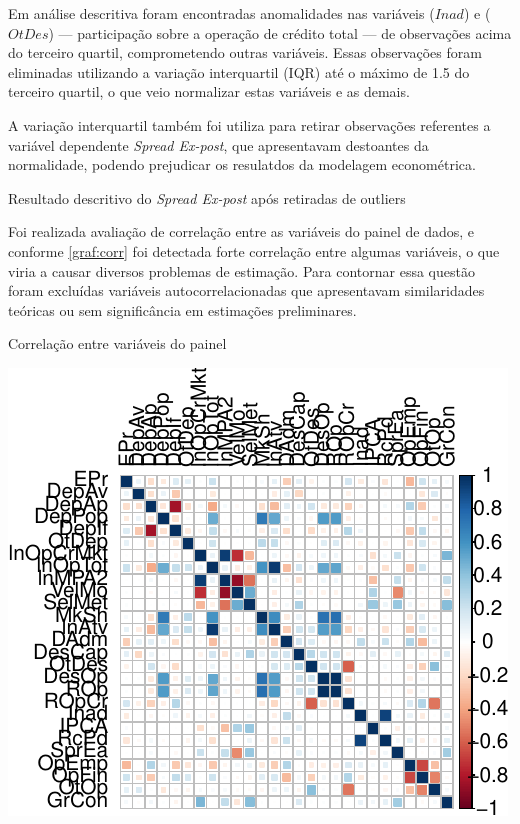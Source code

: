 \documentclass[
  12pt,
  12pt,
  openright,
  oneside,
  a4paper,
  chapter=TITLE,
  section=TITLE,
  subsection=TITLE,
  subsubsection=TITLE,
  english,
  portugues,
  sumario=tradicional]{abntex2}
\begin{document}
Em análise descritiva foram encontradas anomalidades nas variáveis (\(Inad\)) e (\(OtDes\)) --- participação sobre a operação de crédito total --- de observações acima do terceiro quartil, comprometendo outras variáveis. Essas observações foram eliminadas utilizando a variação interquartil (IQR) até o máximo de 1.5 do terceiro quartil, o que veio normalizar estas variáveis e as demais.

A variação interquartil também foi utiliza para retirar observações referentes a variável dependente \emph{Spread Ex-post}, que apresentavam destoantes da normalidade, podendo prejudicar os resulatdos da modelagem econométrica.

\begin{table}
\caption{Resultado descritivo do \emph{Spread Ex-post} após retiradas de outliers}
\vspace{1mm}

\vspace{1mm}
\label{tb:summspr}
\vspace{-2mm}
\end{table}

Foi realizada avaliação de correlação entre as variáveis do painel de dados, e conforme \autoref{graf:corr} foi detectada forte correlação entre algumas variáveis, o que viria a causar diversos problemas de estimação. Para contornar essa questão foram excluídas variáveis autocorrelacionadas que apresentavam similaridades teóricas ou sem significância em estimações preliminares.

\begin{grafico}[!htbp]
\vspace{20pt}
\caption{Correlação entre variáveis do painel}
\vspace{-4mm}

\begin{center}\includegraphics{12-exportedfigures/chart.correlation-1} \end{center}
\vspace{-3mm}
\label{graf:corr}
\vspace{-2mm}
\end{grafico}
\end{document}
